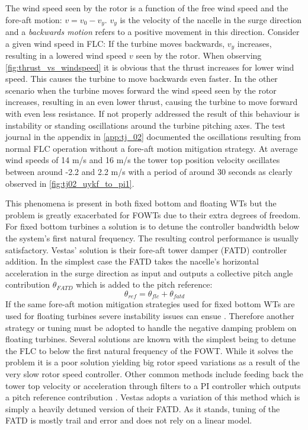 The wind speed seen by the rotor is a function of the free wind speed and the fore-aft motion: $ v = v_0 - v_y $. $ v_y $ is the velocity of the nacelle in the surge direction and a \textit{backwards motion} refers to a positive movement in this direction. Consider a given wind speed in FLC: If the turbine moves backwards, $ v_y $ increases, resulting in a lowered wind speed $ v $ seen by the rotor. When observing \cref{fig:thrust_vs_windspeed} it is obvious that the thrust increases for lower wind speed. This causes the turbine to move backwards even faster. In the other scenario when the turbine moves forward the wind speed seen by the rotor increases, resulting in an even lower thrust, causing the turbine to move forward with even less resistance. If not properly addressed the result of this behaviour is instability or standing oscillations around the turbine pitching axes. The test journal in the appendix in \cref{app:tj_02} documented the oscillations resulting from normal FLC operation without a fore-aft motion mitigation strategy. At average wind speeds of 14 m/s and 16 m/s the tower top position velocity oscillates between around -2.2 and 2.2 m/s with a period of around 30 seconds as clearly observed in \cref{fig:tj02_uykf_to_pi1}.

This phenomena is present in both fixed bottom and floating WTs but the problem is greatly exacerbated for FOWTs due to their extra degrees of freedom. For fixed bottom turbines a solution is to detune the controller bandwidth below the system's first natural frequency. The resulting control performance is usually satisfactory. Vestas' solution is their fore-aft tower damper (FATD) controller addition. In the simplest case the FATD takes the nacelle's horizontal acceleration in the surge direction as input and outputs a collective pitch angle contribution $ \theta_{FATD} $ which is added to the pitch reference:
\begin{equation}\label{eq:fatd}
	\theta_{ref} = \theta_{flc} + \theta_{fatd}
\end{equation}
If the same fore-aft motion mitigation strategies used for fixed bottom WTs are used for floating turbines severe instability issues can ensue \cite{Larsen2007}. Therefore another strategy or tuning must be adopted to handle the negative damping problem on floating turbines. Several solutions are known with the simplest being to detune the FLC to below the first natural frequency of the FOWT. While it solves the problem it is a poor solution yielding big rotor speed variations as a result of the very slow rotor speed controller. Other common methods include feeding back the tower top velocity or acceleration through filters to a PI controller which outputs a pitch reference contribution \cite{Grant2022}. Vestas adopts a variation of this method which is simply a heavily detuned version of their FATD. As it stands, tuning of the FATD is mostly trail and error and does not rely on a linear model.


